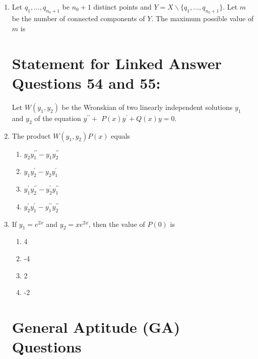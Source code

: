 \documentclass[journal]{IEEEtran}
\begin{document}
\begin{enumerate}
    

 
    \item Let $q_{1}, \ldots, q_{n_{0}+1}$ be $n_{0}+1$ distinct points and $Y=X \backslash\{q_{1}, \ldots, q_{n_{0}+1}\}$. Let $m$ be the number of connected components of $Y$. The maximum possible value of $m$ is $\qquad$
    \\
    \section*{Statement for Linked Answer Questions 54 and 55:}Let $W\left(y_{1}, y_{2}\right)$ be the Wronskian of two linearly independent solutions $y_{1}$ and $y_{2}$ of the equation $y^{\prime \prime}+$ $P(x) y^{\prime}+Q(x) y=0$.
    
  \item The product $W(y_{1}, y_{2}) P(x)$ equals
   \begin{multicols}{4}
			\begin{enumerate}

\item  $y_{2} y_{1}^{\prime \prime}-y_{1} y_{2}^{\prime \prime}$
\item  $y_{1} y_{2}^{\prime}-y_{2} y_{1}^{\prime}$
\item $y_{1}^{\prime} y_{2}^{\prime \prime}-y_{2}^{\prime} y_{1}^{\prime \prime}$

\item $y_{2}^{\prime} y_{1}^{\prime}-y_{1}^{\prime \prime} y_{2}^{\prime \prime}$

        \end{enumerate}
		\end{multicols}
  \item  If $y_{1}=e^{2 x}$ and $y_{2}=x e^{2 x}$, then the value of $P(0)$ is
   \begin{multicols}{4}
			\begin{enumerate}
\item  4
\item -4
\item 2
\item -2

  \end{enumerate}
		\end{multicols}
  \section*{General Aptitude (GA) Questions}

\end{enumerate}
\end{document}
